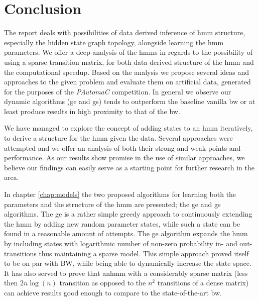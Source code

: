 \chapter{Conclusion}
\label{chap:conclusion}
The report deals with possibilities of data derived inference of \gls{hmm} structure, especially the hidden state graph topology, alongside learning the \gls{hmm} parameters. We offer a deep analysis of the \glspl{hmm} in regards to the possibility of using a sparse transition matrix, for both data derived structure of the \gls{hmm} and the computational  speedup. Based on the analysis we propose several ideas and approaches to the given problem and evaluate them on artificial data, generated for the purposes of the \emph{PAutomaC} competition. In general we observe our dynamic algorithms (\acrfull{ge} and \acrfull{gs}) tends to outperform the baseline vanilla \gls{bw} or at least produce results in high proximity to that of the \gls{bw}.

We have managed to explore the concept of adding states to an \gls{hmm} iteratively, to derive a structure for the \gls{hmm} given the data. Several approaches were attempted and we offer an analysis of both their strong and weak points and performance. As our results show promise in the use of similar approaches, we believe our findings can easily serve as a starting point for further research in the area.

In chapter \ref{chap:models} the two proposed algorithms for learning both the parameters and the structure of the \gls{hmm} are presented; the \acrlong{ge} and \acrlong{gs} algorithms. The \gls{ge} is a rather simple greedy approach to continuously extending the \gls{hmm} by adding new random parameter states, while such a state can be found in a reasonable amount of attempts. The \gls{ge} algorithm expands the \gls{hmm} by including states with logarithmic number of non-zero probability in- and out-transitions thus maintaining a sparse model. This simple approach proved itself to be on par with BW, while being able to dynamically increase the state space. It has also served to prove that an\gls{hmm} with a considerably sparse matrix (less then $2n\log(n)$ transition as opposed to the $n^2$ transitions of a dense matrix) can achieve results good enough to compare to the state-of-the-art \gls{bw}.

